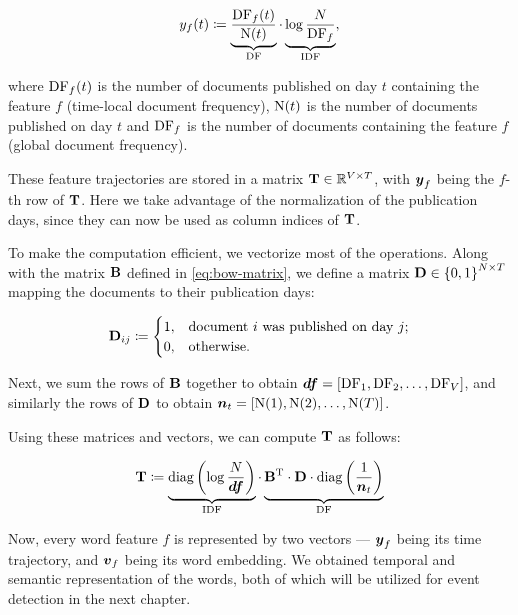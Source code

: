 \begin{equation}
	y_{f}(t) \coloneqq \underbrace{\frac{\text{DF}_{f}(t)}{\text{N}(t)}}_{\text{DF}} \cdot \underbrace{\log{\frac{N}{\text{DF}_{f}}}}_{\text{IDF}},
\end{equation}

where $\text{DF}_{f}(t)$ is the number of documents published on day $t$ containing the feature $f$ (time-local document frequency), $\text{N}(t)$ is the number of documents published on day $t$ and $\text{DF}_{f}$ is the number of documents containing the feature $f$ (global document frequency).

These feature trajectories are stored in a matrix $\mathbf{T} \in \mathbb{R}^{V \times T}$, with $\vect{\traj}_f$ being the $f$-th row of $\mathbf{T}$. Here we take advantage of the normalization of the publication days, since they can now be used as column indices of $\mathbf{T}$.

To make the computation efficient, we vectorize most of the operations. Along with the matrix $\mathbf{B}$ defined in \ref{eq:bow-matrix}, we define a matrix $\mathbf{D} \in \left\{ 0, 1 \right\}^{N \times T}$ mapping the documents to their publication days:

\begin{equation}
	\mathbf{D}_{ij} \coloneqq
	\begin{cases}
		1, & \text{document}~i~\text{was published on day}~j \text{;} \\
		0, & \text{otherwise}.
	\end{cases}
\end{equation}

Next, we sum the rows of $\mathbf{B}$ together to obtain $\vect{\df} = \left[ \text{\df}_{1}, \text{\df}_{2}, \dots, \text{\df}_{\featcount} \right]$, and similarly the rows of $\mathbf{D}$ to obtain $\vect{\doccount}_{t} = \left[ \text{\doccount}(1), \text{\doccount}(2), \dots, \text{\doccount}(\streamlen) \right]$.

Using these matrices and vectors, we can compute $\mathbf{T}$ as follows:

\begin{equation}
	\trajmat \coloneqq
		\underbrace{\text{diag} \left( \log{\frac{\doccount}{\vect{\df}}} \right)}_{\text{IDF}}
		\cdot
		\underbrace{\bowmat^{\T}
		\cdot \dtdmat
		\cdot \text{diag} \left( \frac{1}{\vect{\doccount}_{t}} \right)}_{\text{DF}}
\end{equation}

Now, every word feature $f$ is represented by two vectors --- $\vect{\traj}_{f}$ being its time trajectory, and $\embed_{f}$ being its word embedding. We obtained temporal and semantic representation of the words, both of which will be utilized for event detection in the next chapter.


